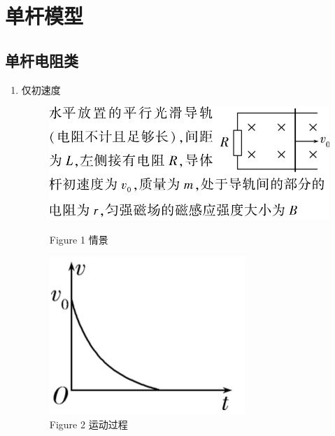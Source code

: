 \documentclass{article}
\begin{document}
\vspace{2em}

\section{单杆模型}

\subsection{单杆电阻类}
\begin{enumerate}[label = (\arabic*{})]
    \item 仅初速度
          \begin{figure}[H]
              \begin{minipage}{0.65\textwidth}
                  \centering
                  \includegraphics[width = \textwidth]{pictures/4.png}
                  \caption*{Figure 1 情景}
              \end{minipage}
              \hfill
              \begin{minipage}{0.3\textwidth}
                  \centering
                  \includegraphics[width = \textwidth]{pictures/5.png}
                  \caption*{Figure 2 运动过程}
              \end{minipage}
          \end{figure}


\end{enumerate}
\end{document}
